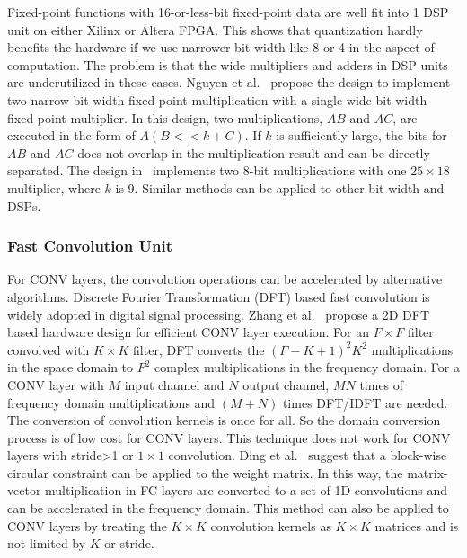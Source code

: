 Fixed-point functions with 16-or-less-bit fixed-point data are well fit into 1 DSP unit on either Xilinx or Altera FPGA. This shows that quantization hardly benefits the hardware if we use narrower bit-width like 8 or 4 in the aspect of computation. The problem is that the wide multipliers and adders in DSP units are underutilized in these cases. Nguyen et al.~\cite{nguyen2017double} propose the design to implement two narrow bit-width fixed-point multiplication with a single wide bit-width fixed-point multiplier. In this design, two multiplications, $AB$ and $AC$, are executed in the form of $A(B<<k+C)$. If $k$ is sufficiently large, the bits for $AB$ and $AC$ does not overlap in the multiplication result and can be directly separated. The design in~\cite{nguyen2017double} implements two 8-bit multiplications with one $25\times 18$ multiplier, where $k$ is 9. Similar methods can be applied to other bit-width and DSPs.




\subsubsection{Fast Convolution Unit}
For CONV layers, the convolution operations can be accelerated by alternative algorithms. Discrete Fourier Transformation (DFT) based fast convolution is widely adopted in digital signal processing. Zhang et al.~\cite{zhang2017frequency} propose a 2D DFT based hardware design for efficient CONV layer execution. For an $F\times F$ filter convolved with $K\times K$ filter, DFT converts the $(F-K+1)^2K^2$ multiplications in the space domain to $F^2$ complex multiplications in the frequency domain. For a CONV layer with $M$ input channel and $N$ output channel, $MN$ times of frequency domain multiplications and $(M+N)$ times DFT/IDFT are needed. The conversion of convolution kernels is once for all. So the domain conversion process is of low cost for CONV layers. This technique does not work for CONV layers with stride>1 or $1\times 1$ convolution. Ding et al.~\cite{ding2017c} suggest that a block-wise circular constraint can be applied to the weight matrix. In this way, the matrix-vector multiplication in FC layers are converted to a set of 1D convolutions and can be accelerated in the frequency domain. This method can also be applied to CONV layers by treating the $K\times K$ convolution kernels as $K\times K$ matrices and is not limited by $K$ or stride.


